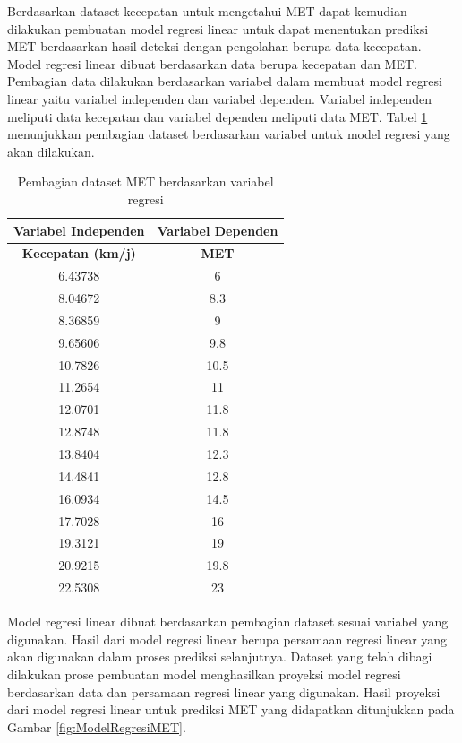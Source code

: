 Berdasarkan dataset kecepatan untuk mengetahui MET dapat kemudian dilakukan pembuatan model regresi linear untuk dapat menentukan prediksi MET berdasarkan hasil deteksi dengan pengolahan berupa data kecepatan. Model regresi linear dibuat berdasarkan data berupa kecepatan dan MET. Pembagian data dilakukan berdasarkan variabel dalam membuat model regresi linear yaitu variabel independen dan variabel dependen. Variabel independen meliputi data kecepatan dan variabel dependen meliputi data MET. Tabel \ref{tb:VariabelPrediksiMET} menunjukkan pembagian dataset berdasarkan variabel untuk model regresi yang akan dilakukan.

\begin{longtable}{|c|c|}
  \caption{Pembagian dataset MET berdasarkan variabel regresi}
  \label{tb:VariabelPrediksiMET}                                   \\
  \hline
  \rowcolor[HTML]{C0C0C0}
  \textbf{Variabel Independen}  & \textbf{Variabel Dependen}  \\
  \hline
  \rowcolor[HTML]{C0C0C0}
  \textbf{Kecepatan (km/j)} & \textbf{MET}  \\
  \hline
  6.43738  & 6    \\
  \hline
  8.04672   & 8.3    \\
  \hline
  8.36859   & 9    \\
  \hline
  9.65606   & 9.8    \\
  \hline
  10.7826   & 10.5    \\
  \hline
  11.2654   & 11    \\
  \hline
  12.0701   & 11.8    \\
  \hline
  12.8748   & 11.8    \\
  \hline
  13.8404   & 12.3    \\
  \hline
  14.4841   & 12.8    \\
  \hline
  16.0934   & 14.5    \\
  \hline
  17.7028   & 16    \\
  \hline
  19.3121   & 19    \\
  \hline
  20.9215   & 19.8    \\
  \hline
  22.5308   & 23    \\
  \hline
\end{longtable}

Model regresi linear dibuat berdasarkan pembagian dataset sesuai variabel yang digunakan. Hasil dari model regresi linear berupa persamaan regresi linear yang akan digunakan dalam proses prediksi selanjutnya. Dataset yang telah dibagi dilakukan prose pembuatan model menghasilkan proyeksi model regresi berdasarkan data dan persamaan regresi linear yang digunakan. Hasil proyeksi dari model regresi linear untuk prediksi MET yang didapatkan ditunjukkan pada Gambar \ref{fig:ModelRegresiMET}.

